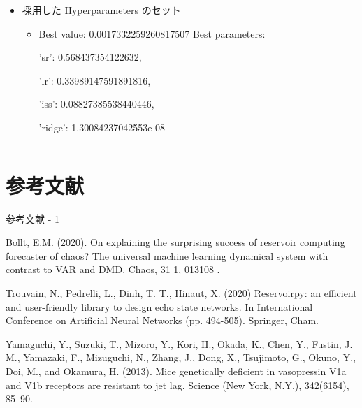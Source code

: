 \begin{frame}
\begin{columns}[T]
\begin{column}{.5\textwidth}
\begin{itemize}
\begin{itemize}
                    sr:  (1e-2, 10, log = True)

                    lr: (1e-3, 1, log = True)

                    iss: (0, 1)
                    
                    ridge: (1e-9, 1e-2, log = True)

                    \item 一様ランダムにサンプリング．
                    \item log = True で$\log$ をとって一様ランダムにサンプリング．
                \end{itemize}
                \item 採用した Hyperparameters のセット\begin{itemize}
                    \item Best value: 0.0017332259260817507
                    Best parameters: {
                        
                        'sr': 0.568437354122632, 
                        
                        'lr': 0.33989147591891816, 
                        
                        'iss': 0.08827385538440446, 
                        
                        'ridge': 1.30084237042553e-08}
                \end{itemize}
            \end{itemize}
        \end{column}
      \end{columns}
    
\end{frame}

\section{参考文献}

\begin{frame}{参考文献 - 1}
    \begin{thebibliography}{99}    
        Bollt, E.M. (2020). On explaining the surprising success of reservoir computing forecaster of chaos? The universal machine learning dynamical system with contrast to VAR and DMD. Chaos, 31 1, 013108 .

        Trouvain, N., Pedrelli, L., Dinh, T. T., Hinaut, X. (2020) Reservoirpy: an efficient and user-friendly library to design echo state networks. In International Conference on Artificial Neural Networks (pp. 494-505). Springer, Cham.

        Yamaguchi, Y., Suzuki, T., Mizoro, Y., Kori, H., Okada, K., Chen, Y., Fustin, J. M., Yamazaki, F., Mizuguchi, N., Zhang, J., Dong, X., Tsujimoto, G., Okuno, Y., Doi, M., and Okamura, H. (2013). Mice genetically deficient in vasopressin V1a and V1b receptors are resistant to jet lag. Science (New York, N.Y.), 342(6154), 85–90. 
    \end{thebibliography}
\end{frame}

